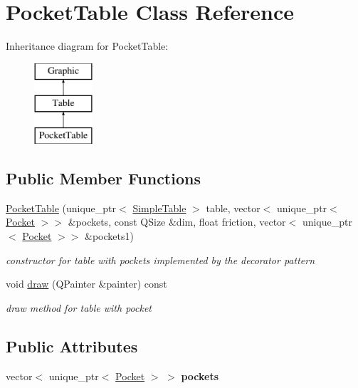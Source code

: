 \hypertarget{class_pocket_table}{}\section{Pocket\+Table Class Reference}
\label{class_pocket_table}
Inheritance diagram for Pocket\+Table\+:\begin{figure}[H]
\begin{center}
\leavevmode
\includegraphics[height=3.000000cm]{class_pocket_table}
\end{center}
\end{figure}
\subsection*{Public Member Functions}
\begin{DoxyCompactItemize}
\item 
\mbox{\hyperlink{class_pocket_table_a774e36c15c5fda9070c8ed13abb49950}{Pocket\+Table}} (unique\+\_\+ptr$<$ \mbox{\hyperlink{class_simple_table}{Simple\+Table}} $>$ table, vector$<$ unique\+\_\+ptr$<$ \mbox{\hyperlink{class_pocket}{Pocket}} $>$$>$ \&pockets, const Q\+Size \&dim, float friction, vector$<$ unique\+\_\+ptr$<$ \mbox{\hyperlink{class_pocket}{Pocket}} $>$$>$ \&pockets1)
\begin{DoxyCompactList}\small\item\em constructor for table with pockets implemented by the decorator pattern \end{DoxyCompactList}\item 
void \mbox{\hyperlink{class_pocket_table_ab7c2954c1723c070836b453fe0a3bf67}{draw}} (Q\+Painter \&painter) const
\begin{DoxyCompactList}\small\item\em draw method for table with pocket \end{DoxyCompactList}\end{DoxyCompactItemize}
\subsection*{Public Attributes}
\begin{DoxyCompactItemize}
\item 
\mbox{\label{class_pocket_table_a5b0f120d075425febbf04939198490dd}} 
vector$<$ unique\+\_\+ptr$<$ \mbox{\hyperlink{class_pocket}{Pocket}} $>$ $>$ {\bfseries pockets}
\end{DoxyCompactItemize}



